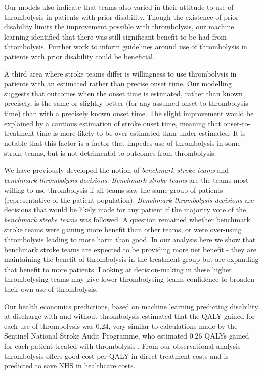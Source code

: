 Our models also indicate that teams also varied in their attitude to use of thrombolysis in patients with prior disability. Though the existence of prior disability limits the improvement possible with thrombolysis, our machine learning identified that there was still significant benefit to be had from thrombolysis. Further work to inform guidelines around use of thrombolysis in patients with prior disability could be beneficial.

A third area where stroke teams differ is willingness to use thrombolysis in patients with an estimated rather than precise onset time. Our modelling suggests that outcomes when the onset time is estimated, rather than known precisely, is the same or slightly better (for any assumed onset-to-thrombolysis time) than with a precisely known onset time. The slight improvement would be explained by a cautious estimation of stroke onset time, meaning that onset-to-treatment time is more likely to be over-estimated than under-estimated. It is notable that this factor is a factor that impedes use of thrombolysis in some stroke teams, but is not detrimental to outcomes from thrombolysis.

We have previously developed the notion of \textit{benchmark stroke teams} and \textit{benchmark thrombolysis decisions}. \textit{Benchmark stroke teams} are the teams most willing to use thrombolysis if all teams saw the same group of patients (representative of the patient population). \textit{Benchmark thrombolysis decisions} are decisions that would be likely made for any patient if the majority vote of the \textit{benchmark stroke teams} was followed. A question remained whether benchmark stroke teams were gaining more benefit than other teams, or were over-using thrombolysis leading to more harm than good. In our analysis here we show that benchmark stroke teams are expected to be providing more net benefit - they are maintaining the benefit of thrombolysis in the treatment group but are expanding that benefit to more patients. Looking at decision-making in these higher thrombolysing teams may give lower-thrombolysing teams confidence to broaden their own use of thrombolysis.

Our health economics predictions, based on machine learning predicting disability at discharge with and without thrombolysis estimated that the QALY gained for each use of thrombolysis was 0.24, very similar to calculations made by the Sentinel National Stroke Audit Programme, who estimated 0.26 QALYs gained for each patient treated with thrombolysis \cite{sentinel_stroke_national_audit_programme_cost_2016}. From our observational analysis thrombolysis offers good cost per QALY in direct treatment costs and is predicted to save NHS in healthcare costs.

